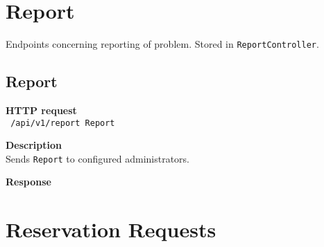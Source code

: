 \section{Report}
Endpoints concerning reporting of problem. Stored in \texttt{ReportController}.

\subsection{Report}
\begin{description}
    \item \textbf{HTTP request}\\
        \texttt{\text{[POST]} /api/v1/report \texttt{Report}}
    \item \textbf{Description}\\
        Sends \texttt{Report} to configured administrators.
    \item \textbf{Response}\\
        \texttt{\text{[200 OK]}}
\end{description}


\section{Reservation Requests}
